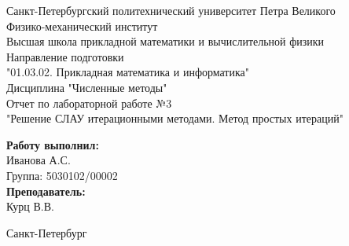 \begin{titlepage}	%

	\begin{center}		%

		\large Санкт-Петербургский политехнический университет Петра Великого\\
		\large Физико-механический институт \\
		\large Высшая школа прикладной математики и вычислительной физики\\[3cm]
		\large Направление подготовки\\
		\large "01.03.02. Прикладная математика и информатика"\\[3cm]
		\huge Дисциплина "Численные методы"\\[0.5cm] %
		\large Отчет по лабораторной работе №3\\[0.1cm]
		\large "Решение СЛАУ итерационными методами. Метод простых итераций"\\[5cm]

	\end{center}


	\begin{flushright} %
		\begin{minipage}{0.25\textwidth} %
			\begin{flushleft} %

				\large\textbf{Работу выполнил:}\\
				\large Иванова А.С.\\
				\large {Группа:} 5030102/00002\\
				
				\large \textbf{Преподаватель:}\\
				\large Курц В.В.

			\end{flushleft}
		\end{minipage}
	\end{flushright}
	
	\vfill %

	\begin{center}
	\large Санкт-Петербург\\
	\large \the\year %
	\end{center} %

\end{titlepage} %

\vfill %
